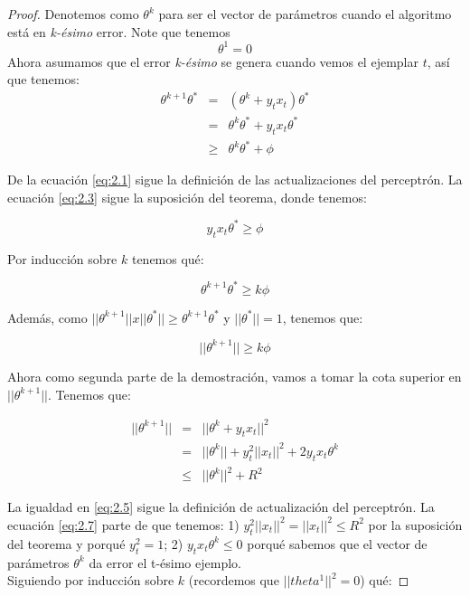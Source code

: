 \begin{proof}
Denotemos como $\theta^k$ para ser el vector de parámetros cuando el
algoritmo está en \textit{k-ésimo} error. Note que tenemos
\begin{equation*}
\theta^1 = 0
\end{equation*}
Ahora asumamos que el error \textit{k-ésimo} se genera cuando vemos el
ejemplar $t$, así que tenemos:
\begin{eqnarray}
  \theta^{k+1}\theta^* & = & (\theta^k + y_tx_t)\theta^* \label{eq:2.1}\\
                      & = & \theta^k\theta^* + y_tx_t\theta^* \label{eq:2.2}\\
                      & \geq & \theta^k\theta^* + \phi \label{eq:2.3}
\end{eqnarray}

De la ecuación \ref{eq:2.1} sigue la definición de las actualizaciones
del perceptrón. La ecuación \ref{eq:2.3} sigue la suposición del
teorema, donde tenemos:

\begin{equation*}
  y_tx_t\theta^* \geq \phi
\end{equation*}

Por inducción sobre $k$ tenemos qué:

\begin{equation*}
  \theta^{k+1}\theta^* \geq k\phi
\end{equation*}

Además, como $||\theta^{k+1}|| x ||\theta^*|| \geq \theta^{k+1}\theta^*$
y $||\theta^*|| = 1 $, tenemos que:

\begin{equation}
  \label{eq:2.4}
  ||\theta^{k+1}|| \geq k\phi
\end{equation}

Ahora como segunda parte de la demostración, vamos a tomar la cota
superior en $||\theta^{k+1}||$. Tenemos que:

\begin{eqnarray}
  ||\theta^{k+1}|| & = & ||\theta^k + y_tx_t||^2 \label{eq:2.5}\\
                   & = & ||\theta^k|| + y_t^2||x_t||^2 +
                         2y_tx_t\theta^k \label{eq:2.6}\\
                   & \leq & ||\theta^k||^2 + R^2 \label{eq:2.7}
\end{eqnarray}

La igualdad en \ref{eq:2.5} sigue la definición de actualización del
perceptrón. La ecuación \ref{eq:2.7} parte de que tenemos: 1)
$y_t^2||x_t||^2 = ||x_t||^2 \leq R^2$ por la suposición del teorema y
porqué $y_t^2=1$; 2) $y_tx_t\theta^k \leq 0$ porqué sabemos que el
vector de parámetros $\theta^k$ da error el t-ésimo ejemplo.\\
Siguiendo por inducción sobre $k$ (recordemos que $||theta^1||^2 = 0$)
qué:


\end{proof}
